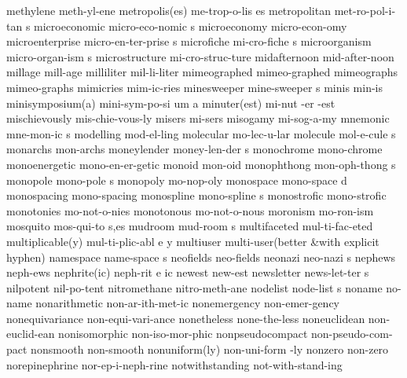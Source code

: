 \1 methylene		meth-yl-ene		%
\2 metropolis(es)	me-trop-o-lis es
\5 metropolitan		met-ro-pol-i-tan s
\5 microeconomic	micro-eco-nomic s
\1 microeconomy		micro-econ-omy		%
\5 microenterprise	micro-en-ter-prise s	%
\5 microfiche		mi-cro-fiche s
\5 microorganism	micro-organ-ism s	%
\1 microstructure	mi-cro-struc-ture	%
\1 midafternoon 	mid-after-noon		%
\1 millage		mill-age
\1 milliliter		mil-li-liter
\1 mimeographed 	mimeo-graphed
\1 mimeographs		mimeo-graphs
\1 mimicries		mim-ic-ries
\5 minesweeper		mine-sweeper s		%
\1 minis		min-is
\3 minisymposium(a)	mini-sym-po-si um a
\3 minuter(est)		mi-nut -er -est
\1 mischievously	mis-chie-vous-ly
\1 misers		mi-sers
\1 misogamy		mi-sog-a-my
\5 mnemonic		mne-mon-ic s		%
\1 modelling		mod-el-ling
\NewWordtrue
\1 molecular		mo-lec-u-lar		%
\5 molecule		mol-e-cule s
\1 monarchs		mon-archs
\5 moneylender		money-len-der s
\1 monochrome		mono-chrome
\1 monoenergetic	mono-en-er-getic
\1 monoid		mon-oid
\5 monophthong		mon-oph-thong s		%
\5 monopole		mono-pole s
\1 monopoly		mo-nop-oly
\5 monospace		mono-space d		%
\1 monospacing		mono-spacing		%
\5 monospline		mono-spline s
\1 monostrofic		mono-strofic
\1 monotonies		mo-not-o-nies
\1 monotonous		mo-not-o-nous
\1 moronism		mo-ron-ism
\5 mosquito		mos-qui-to s,es
\5 mudroom		mud-room s
\1 multifaceted 	mul-ti-fac-eted
\3 multiplicable(y)	mul-ti-plic-abl e y
\1 multiuser		multi-user\quad (better
\tabalign		&\null\quad with explicit hyphen)\cr
\5 namespace		name-space s		%
\1 neofields		neo-fields
\5 neonazi		neo-nazi s
\1 nephews		neph-ews		%
\3 nephrite(ic)		neph-rit e ic		%
\1 newest		new-est 		%
\5 newsletter		news-let-ter s
\1 nilpotent            nil-po-tent             %
\1 nitromethane		nitro-meth-ane		%
\5 nodelist		node-list s		%
\1 noname		no-name
\1 nonarithmetic	non-ar-ith-met-ic	%
\1 nonemergency 	non-emer-gency
\1 nonequivariance	non-equi-vari-ance
\1 nonetheless		none-the-less        %
\1 noneuclidean 	non-euclid-ean
\1 nonisomorphic	non-iso-mor-phic
\1 nonpseudocompact	non-pseudo-com-pact
\1 nonsmooth		non-smooth
\2 nonuniform(ly)	non-uni-form -ly
\1 nonzero		non-zero		%
\1 norepinephrine	nor-ep-i-neph-rine
\1 notwithstanding	not-with-stand-ing   %
